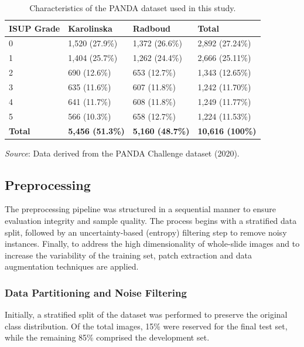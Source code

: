 \begin{table}[!ht]
	\centering
	\begin{tabular*}{\textwidth}{@{\extracolsep\fill}llll@{}}
		\toprule
		\textbf{ISUP Grade} & \textbf{Karolinska} & \textbf{Radboud} & \textbf{Total} \\
		\midrule
		0 & 1,520 (27.9\%) & 1,372 (26.6\%) & 2,892 (27.24\%) \\
		1 & 1,404 (25.7\%) & 1,262 (24.4\%) & 2,666 (25.11\%) \\
		2 & 690 (12.6\%) & 653 (12.7\%) & 1,343 (12.65\%) \\
		3 & 635 (11.6\%) & 607 (11.8\%) & 1,242 (11.70\%) \\
		4 & 641 (11.7\%) & 608 (11.8\%) & 1,249 (11.77\%) \\
		5 & 566 (10.3\%) & 658 (12.7\%) & 1,224 (11.53\%) \\
		\midrule
		\textbf{Total} & \textbf{5,456 (51.3\%)} & \textbf{5,160 (48.7\%)} & \textbf{10,616 (100\%)} \\
		\bottomrule
	\end{tabular*}
	\begin{tablenotes}
		\item {\it Source}: Data derived from the PANDA Challenge dataset (2020).
	\end{tablenotes}
	\caption{Characteristics of the PANDA dataset used in this study.\label{tab:dist_classes}}
\end{table}


\subsection{Preprocessing}
\label{subsec:preprocessing}

The preprocessing pipeline was structured in a sequential manner to ensure evaluation integrity and sample quality. The process begins with a stratified data split, followed by an uncertainty-based (entropy) filtering step to remove noisy instances. Finally, to address the high dimensionality of whole-slide images and to increase the variability of the training set, patch extraction and data augmentation techniques are applied.

\subsubsection{Data Partitioning and Noise Filtering}
\label{subsubsec:partitioning-filtering}
Initially, a stratified split of the dataset was performed to preserve the original class distribution. Of the total images, 15\% were reserved for the final test set, while the remaining 85\% comprised the development set.

